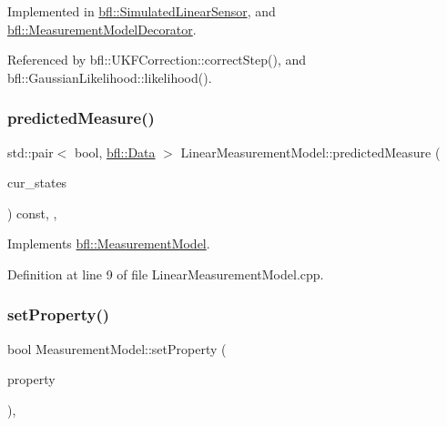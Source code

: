 Implemented in \mbox{\hyperlink{classbfl_1_1SimulatedLinearSensor_a61c278bdbc5f3a0201d2f855a739d4f4}{bfl\+::\+Simulated\+Linear\+Sensor}}, and \mbox{\hyperlink{classbfl_1_1MeasurementModelDecorator_a36194c2f6abd7e13a417c3663febe921}{bfl\+::\+Measurement\+Model\+Decorator}}.



Referenced by bfl\+::\+U\+K\+F\+Correction\+::correct\+Step(), and bfl\+::\+Gaussian\+Likelihood\+::likelihood().

\mbox{\label{classbfl_1_1LinearMeasurementModel_a8831b8acb4790db4c69db73200375c69}} 
\subsubsection{\texorpdfstring{predicted\+Measure()}{predictedMeasure()}}
{\footnotesize\ttfamily std\+::pair$<$ bool, \mbox{\hyperlink{namespacebfl_af6b103c6821db1b54452f776fdd9dd02}{bfl\+::\+Data}} $>$ Linear\+Measurement\+Model\+::predicted\+Measure (\begin{DoxyParamCaption}\item[{const Eigen\+::\+Ref$<$ const Eigen\+::\+Matrix\+Xd $>$ \&}]{cur\+\_\+states }\end{DoxyParamCaption}) const\hspace{0.3cm}{\ttfamily [override]}, {\ttfamily [virtual]}, {\ttfamily [inherited]}}



Implements \mbox{\hyperlink{classbfl_1_1MeasurementModel_a8fc8798aa2db48f428d4ce59b33b5307}{bfl\+::\+Measurement\+Model}}.



Definition at line 9 of file Linear\+Measurement\+Model.\+cpp.

\mbox{\label{classbfl_1_1MeasurementModel_af97e18b52d1a3f365dd5982b8cc4aff7}} 
\subsubsection{\texorpdfstring{set\+Property()}{setProperty()}}
{\footnotesize\ttfamily bool Measurement\+Model\+::set\+Property (\begin{DoxyParamCaption}\item[{const std\+::string \&}]{property }\end{DoxyParamCaption})\hspace{0.3cm}{\ttfamily [virtual]}, {\ttfamily [inherited]}}



